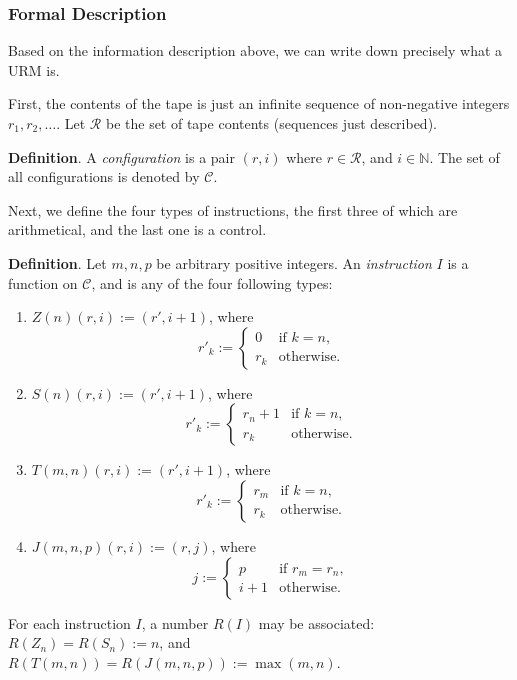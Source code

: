 \documentclass[12pt]{article}
\begin{document}
\subsubsection*{Formal Description}

Based on the information description above, we can write down precisely what a URM is.  

First, the contents of the tape is just an infinite sequence of non-negative integers $r_1, r_2, \ldots$.  Let $\mathcal{R}$ be the set of tape contents (sequences just described).

\textbf{Definition}.  A \emph{configuration} is a pair $(r,i)$ where $r\in \mathcal{R}$, and $i\in \mathbb{N}$.  The set of all configurations is denoted by $\mathcal{C}$.

Next, we define the four types of instructions, the first three of which are arithmetical, and the last one is a control.

\textbf{Definition}.  Let $m,n,p$ be arbitrary positive integers.  An \emph{instruction} $I$ is a function on $\mathcal{C}$, and is any of the four following types:
\begin{enumerate}
\item $Z(n)(r,i):=(r',i+1)$, where 
\begin{displaymath}
r'_k:= \left\{
\begin{array}{ll}
0 & \textrm{if }k = n, \\
r_k & \textrm{otherwise.}
\end{array}
\right.
\end{displaymath}
\item $S(n)(r,i):=(r',i+1)$, where
\begin{displaymath}
r'_k:= \left\{
\begin{array}{ll}
r_n + 1 & \textrm{if }k = n, \\
r_k & \textrm{otherwise.}
\end{array}
\right.
\end{displaymath}
\item $T(m,n)(r,i):=(r',i+1)$, where
\begin{displaymath}
r'_k:= \left\{
\begin{array}{ll}
r_m & \textrm{if }k = n, \\
r_k & \textrm{otherwise.}
\end{array}
\right.
\end{displaymath}
\item $J(m,n,p)(r,i):=(r,j)$, where
\begin{displaymath}
j := \left\{
\begin{array}{ll}
p & \textrm{if }r_m = r_n, \\
i+1 & \textrm{otherwise.}
\end{array}
\right.
\end{displaymath}
\end{enumerate}
For each instruction $I$, a number $R(I)$ may be associated: $R(Z_n)=R(S_n):=n$, and $R(T(m,n))=R(J(m,n,p)):=\max(m,n)$.
\end{document}
